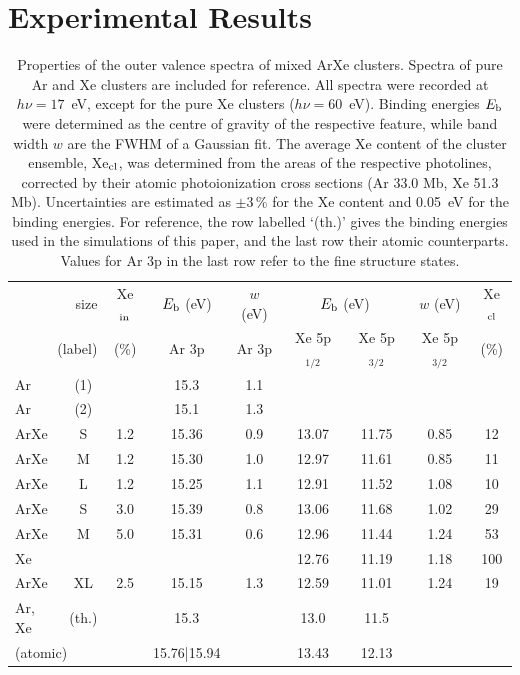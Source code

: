 \section{Experimental Results}
\label{sec:exp_results}
%
%
\begin{table}
\caption{Properties of the outer valence spectra of mixed ArXe clusters. 
Spectra of pure Ar and Xe clusters are included for reference. 
All spectra were recorded at $h\nu = 17$~eV, except for the pure Xe clusters ($h\nu = 60$~eV). 
Binding energies $E_{\rm b}$ were determined as the centre of gravity of the respective feature, while band width $w$ are the FWHM of a Gaussian fit. 
The average Xe content of the cluster ensemble, Xe$_{\rm cl}$, was determined from the areas of the respective photolines, corrected by their atomic photoionization cross sections (Ar 33.0 Mb, Xe 51.3 Mb)\cite{samson2002}.
Uncertainties are estimated as $\pm$3\,\% for the Xe content and 0.05~eV for the binding energies. 
For reference, the row labelled `(th.)' gives the binding energies used in the simulations of this paper, and the last row their atomic counterparts. 
Values for Ar 3p in the last row refer to the fine structure states.
\label{tab:valence}}
\begin{tabular}{ l c c c c c c c c}
%
\toprule
 \multicolumn{2}{r}{size} &  Xe$_{\rm in}$& $E_{\rm b}$ (eV)& $w$ (eV)& \multicolumn{2}{c}{$E_{\rm b}$ (eV)}  & $w$ (eV) &  Xe$_{\rm cl}$ \\
%
 \multicolumn{2}{r}{(label)}&  (\%) & Ar 3p & Ar 3p & Xe 5p$_{1/2}$ &  Xe 5p$_{3/2}$ & Xe 5p$_{3/2}$  &  (\%) \\
\midrule
 Ar & (1) &&  15.3  &  1.1 & & & &  \\
 Ar & (2) &&  15.1  &  1.3 & & & &  \\
%
 ArXe & S &1.2 & 15.36 & 0.9 & 13.07 & 11.75 & 0.85 & 12\\
 ArXe & M &1.2 & 15.30 & 1.0 & 12.97 & 11.61 & 0.85 & 11\\
 ArXe & L &1.2 & 15.25 & 1.1 & 12.91 & 11.52 & 1.08 & 10\\
 ArXe & S &3.0 & 15.39 & 0.8 & 13.06 & 11.68 & 1.02 & 29\\
 ArXe & M &5.0 & 15.31 & 0.6 & 12.96 & 11.44 & 1.24 & 53\\
 Xe &  & & & & 12.76 & 11.19 & 1.18 & 100\\
%
\midrule
%
 ArXe & XL &2.5 & 15.15 & 1.3 & 12.59 & 11.01 & 1.24 & 19\\
%
\midrule
 Ar, Xe & (th.) && 15.3 && 13.0 & 11.5 &&\\
%
 \multicolumn{2}{l}{(atomic)\cite{velchev,sansonetti}} && 15.76|15.94 && 13.43 & 12.13 &&\\
%
\bottomrule
\end{tabular}
\end{table}


